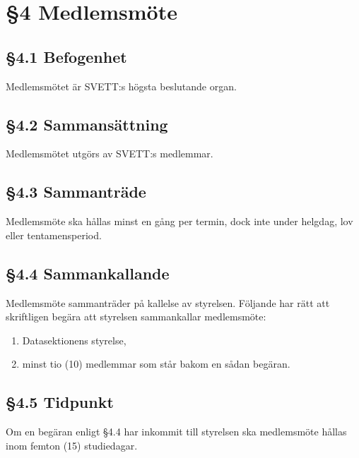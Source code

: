 \section*{\S4 Medlemsmöte}

\subsection*{\S4.1 Befogenhet}
{}

Medlemsmötet är SVETT:s högsta beslutande organ.

\subsection*{\S4.2 Sammansättning}

Medlemsmötet utgörs av SVETT:s medlemmar.

\subsection*{\S4.3 Sammanträde}

Medlemsmöte ska hållas minst en gång per termin, dock inte under helgdag, lov eller
tentamensperiod.

\subsection*{\S4.4 Sammankallande}

Medlemsmöte sammanträder på kallelse av styrelsen. Följande har rätt att skriftligen
begära att styrelsen sammankallar medlemsmöte:
\begin{enumerate}[label=\roman*)]
	\item Datasektionens styrelse,
	\item minst tio (10) medlemmar som står bakom en sådan begäran.
\end{enumerate}

\subsection*{\S4.5 Tidpunkt}

Om en begäran enligt \S4.4 har inkommit till styrelsen ska medlemsmöte hållas inom
femton (15) studiedagar.

